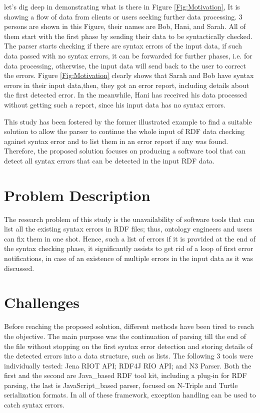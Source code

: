 let's dig deep in demonstrating what is there in  {Figure \ref{Fig:Motivation}}, It is showing a flow of data from clients or users seeking further data processing. 3 persons are shown in this Figure, their names are Bob, Hani, and Sarah. All of them start with the first phase by sending their data to be syntactically checked. The parser starts checking if there are syntax errors of the input data, if such data passed with no syntax errors, it can be forwarded for further phases, i.e. for data processing, otherwise, the input data will send back to the user to correct the errors. {Figure \ref{Fig:Motivation}} clearly shows that Sarah and Bob have syntax errors in their input data,then, they got an error report, including details about the first detected error. In the meanwhile, Hani has received his data processed without getting such a report, since his input data has no syntax errors. 

This study has been fostered by the former illustrated example to find a suitable solution to allow the parser to continue the whole input of RDF data checking against syntax error and to list them in an error report if any was found. Therefore, the proposed solution focuses on producing a software tool that can detect all syntax errors that can be detected in the input RDF data. 

\section{Problem Description } 	
The research problem of this study is the unavailability of software tools that can list all the existing syntax errors in RDF files; thus, ontology engineers and users can fix them in one shot. Hence, such a list of errors if it is provided at the end of the syntax checking phase, it significantly assists to get rid of a loop of first error notifications, in case of an existence of multiple errors  in the input data as it was discussed.  

\section{Challenges}
Before reaching the proposed solution, different methods have been tired to reach the objective. The main purpose was the continuation of parsing till the end of the file without stopping on the first syntax error detection  and storing details of the detected errors into a data structure, such as lists. The following 3 tools were individually tested: Jena RIOT API\cite{McBride:2002:JSW:613357.613755}; RDF4J RIO API\cite{RDF4J:Online}; and  N3 Parser\cite{N3Parser:Online}. Both the first and the second are Java\_based RDF tool kit, including a plug-in for RDF parsing, the last is JavaScript\_based parser, focused on N-Triple and Turtle serialization formats. In all of these framework, exception handling can be used to catch syntax errors. 


